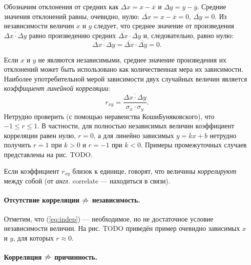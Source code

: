 Обозначим отклонения от средних как $\Delta x=x-\overline{x}$ и $\Delta y=y-\overline{y}$.
Средние значения отклонений равны, очевидно, нулю: $\overline{\Delta x}=x-\overline{x}=0$,
$\overline{\Delta y}=0$. Из независимости величин $x$ и $y$ следует,
что среднее значение от произведения $\overline{\Delta x\cdot\Delta y}$
равно произведению средних $\overline{\Delta x}\cdot\overline{\Delta y}$
и, следовательно, равно нулю: 
\begin{equation}
\overline{\Delta x\cdot\Delta y}=\overline{\Delta x}\cdot\overline{\Delta y}=0.\label{eq:indep}
\end{equation}

Если $x$ и $y$ не являются независимыми, среднее значение произведения
их отклонений может быть использовано как количественная мера их зависимости.
Наиболее употребительной мерой зависимости двух случайных величин
является \emph{коэффициент линейной корреляции}:
\begin{equation}
r_{xy}=\frac{\overline{\Delta x\cdot\Delta y}}{\sigma_{x}\cdot\sigma_{y}}.\label{eq:pearson}
\end{equation}
Нетрудно проверить (с помощью неравенства Коши\textendash Буняковского),
что $-1\le r\le1$. В частности, для полностью независимых величин
коэффициент корреляции равен нулю, $r=0$, а для линейно зависимых
$y=kx+b$ нетрудно получить $r=1$ при $k>0$ и $r=-1$ при $k<0$.
Примеры промежуточных случаев представлены на рис. TODO.

Если коэффициент $r_{xy}$ близок к единице, говорят, что величины
\emph{коррелируют} между собой (от \emph{англ.} correlate ---
находиться в связи).

\paragraph{Отсутствие корреляции $\protect\not\Rightarrow$ независимость.}

{\small{}Отметим, что (\ref{eq:indep}) --- необходимое,
но не достаточное условие независимости величин. На рис. TODO приведён
пример очевидно зависимых $x$ и $y$, для которых $r\approx0$.}{\small\par}

\paragraph{Корреляция $\protect\not\Rightarrow$ причинность.}

